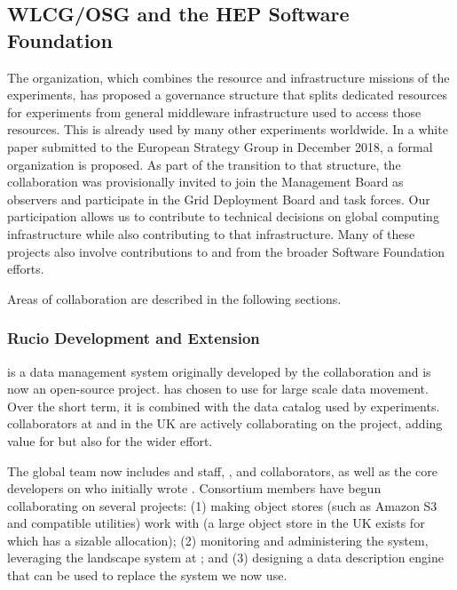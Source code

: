\subsection{WLCG/OSG and the HEP Software Foundation}
The  \cite{Bird:2014ctt} organization, which combines the resource and infrastructure missions of the  experiments, has proposed a governance structure that splits dedicated resources for  experiments from general middleware infrastructure used to access those resources.  This  is already used by many other experiments worldwide.  In a white paper submitted to the European Strategy Group in December 2018\cite{bib:BirdEUStrategy}, a formal  organization is proposed. As part of the transition to that structure, the  collaboration was provisionally invited to join the  Management Board as observers and participate in the Grid Deployment Board and task forces. Our participation allows us to contribute to technical decisions on global computing infrastructure while also contributing to that infrastructure. 
Many of these projects also involve contributions to and from the broader  Software Foundation efforts. 

Areas of collaboration are described in the following sections. 

\subsubsection{Rucio Development and Extension}

 \cite{Barisits:2019fyl}
is a data management system originally developed by the  collaboration and is now an open-source project.   has chosen to use  for large scale data movement.  Over the short term, it is combined with the  data catalog used by  experiments.   collaborators at  and in the UK are actively collaborating on the  project, adding value for  but also for the wider effort.


The global  team now includes  and  staff, , and  collaborators, as well as the core developers on  who initially wrote .  Consortium members have begun collaborating on several projects:  (1) making object stores (such as Amazon S3 and compatible utilities) work with  (a large object store in the UK exists for which  has a sizable allocation);  (2) monitoring  and administering the  system, leveraging the landscape system at ; and  (3) designing a  data description engine that can be used to replace the  system we now use.



